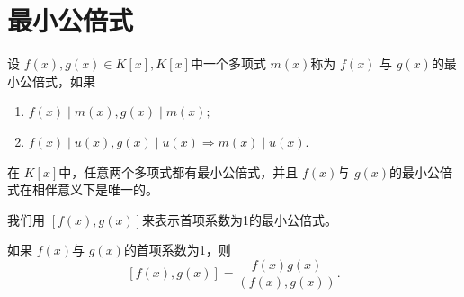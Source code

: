\section{最小公倍式}
\begin{mydef}
  设 $f(x),g(x)\in K[x],K[x]$中一个多项式 $m(x)$称为 $f(x)$ 与  $g(x)$的最小公倍式，如果 
  \begin{enumerate}
    \item $f(x)\mid m(x),g(x)\mid m(x);$
    \item $f(x)\mid u(x),g(x)\mid u(x)\Rightarrow m(x)\mid u(x).$
  \end{enumerate}  
\end{mydef}
\begin{myprop}
    在 $K[x]$中，任意两个多项式都有最小公倍式，并且 $f(x)$与 $g(x)$的最小公倍式在相伴意义下是唯一的。
\end{myprop}
我们用 $[f(x),g(x)]$来表示首项系数为1的最小公倍式。
\begin{myprop}
    如果 $f(x)$与 $g(x)$的首项系数为1，则
    \[[f(x),g(x)]=\frac{f(x)g(x)}{(f(x),g(x))}.\]
\end{myprop}

